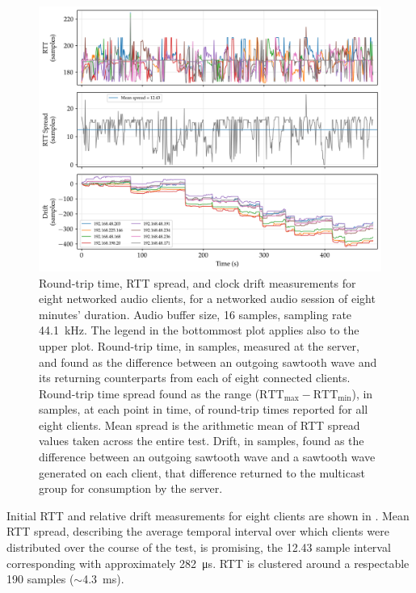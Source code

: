 \begin{figure}[h]
    \centering
    \includegraphics[width=\textwidth]{figures/rtt_drift_16}
    \caption{
        Round-trip time, RTT spread, and clock drift measurements for eight
        networked audio clients, for a networked audio session of eight minutes'
        duration.
        Audio buffer size, 16 samples, sampling rate \qty{44.1}{\kHz}.
        The legend in the bottommost plot applies also to the upper plot.
        Round-trip time, in samples, measured at the server, and found as the
        difference between an outgoing sawtooth wave and its returning
        counterparts from each of eight connected clients.
        Round-trip time spread found as the range ($\text{RTT}_{\max} -
        \text{RTT}_{\min}$), in samples, at each point in time, of
        round-trip times reported for all eight clients.
        Mean spread is the arithmetic mean of RTT spread values taken across
        the entire test.
        Drift, in samples, found as the difference between an outgoing sawtooth
        wave and a sawtooth wave generated on each client, that difference
        returned to the multicast group for consumption by the server.
    }
    \label{fig:rtt-drift-16}
\end{figure}

Initial RTT and relative drift measurements for eight clients are shown in
.
Mean RTT spread, describing the average temporal interval over which clients
were distributed over the course of the test, is promising, the 12.43 sample
interval corresponding with approximately \qty{282}{\us}.
RTT is clustered around a respectable 190 samples ($\sim$\qty{4.3}{\ms}).

